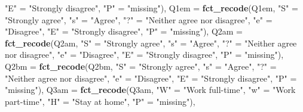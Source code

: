 \documentclass[
  finnish,
]{book}
\newenvironment{Shaded}{\begin{snugshade}}{\end{snugshade}}
\newcommand{\DataTypeTok}[1]{\textcolor[rgb]{0.13,0.29,0.53}{#1}}
\newcommand{\KeywordTok}[1]{\textcolor[rgb]{0.13,0.29,0.53}{\textbf{#1}}}
\newcommand{\NormalTok}[1]{#1}
\newcommand{\StringTok}[1]{\textcolor[rgb]{0.31,0.60,0.02}{#1}}
\begin{document}
\begin{Shaded}
\begin{Highlighting}[]
{{{{{{{{{{{{{{{{{{{{{{{{{{{{{{{{{{{{{{{{{{{{{{{{{{{{{{{{{{{{{{{{{{{{{{{{{{{{{{{{{{{{{{{{{{{{{{{{{{{{{{{{{{                           \StringTok{"E"}\NormalTok{ =}\StringTok{ "Strongly disagree"}\NormalTok{,}
                           \StringTok{"P"}\NormalTok{ =}\StringTok{ "missing"}\NormalTok{),}
           \DataTypeTok{Q1em =} \KeywordTok{fct_recode}\NormalTok{(Q1em,}
                           \StringTok{"S"}\NormalTok{ =}\StringTok{ "Strongly agree"}\NormalTok{,}
                           \StringTok{"s"}\NormalTok{ =}\StringTok{ "Agree"}\NormalTok{,}
                           \StringTok{"?"}\NormalTok{ =}\StringTok{ "Neither agree nor disagree"}\NormalTok{,}
                           \StringTok{"e"}\NormalTok{ =}\StringTok{ "Disagree"}\NormalTok{,}
                           \StringTok{"E"}\NormalTok{ =}\StringTok{ "Strongly disagree"}\NormalTok{,}
                           \StringTok{"P"}\NormalTok{ =}\StringTok{ "missing"}\NormalTok{),}
           \DataTypeTok{Q2am =} \KeywordTok{fct_recode}\NormalTok{(Q2am,}
                            \StringTok{"S"}\NormalTok{ =}\StringTok{ "Strongly agree"}\NormalTok{,}
                            \StringTok{"s"}\NormalTok{ =}\StringTok{ "Agree"}\NormalTok{,}
                            \StringTok{"?"}\NormalTok{ =}\StringTok{ "Neither agree nor disagree"}\NormalTok{,}
                            \StringTok{"e"}\NormalTok{ =}\StringTok{ "Disagree"}\NormalTok{,}
                            \StringTok{"E"}\NormalTok{ =}\StringTok{ "Strongly disagree"}\NormalTok{,}
                            \StringTok{"P"}\NormalTok{ =}\StringTok{ "missing"}\NormalTok{),}
           \DataTypeTok{Q2bm =} \KeywordTok{fct_recode}\NormalTok{(Q2bm,}
                            \StringTok{"S"}\NormalTok{ =}\StringTok{ "Strongly agree"}\NormalTok{,}
                            \StringTok{"s"}\NormalTok{ =}\StringTok{ "Agree"}\NormalTok{,}
                            \StringTok{"?"}\NormalTok{ =}\StringTok{ "Neither agree nor disagree"}\NormalTok{,}
                            \StringTok{"e"}\NormalTok{ =}\StringTok{ "Disagree"}\NormalTok{,}
                            \StringTok{"E"}\NormalTok{ =}\StringTok{ "Strongly disagree"}\NormalTok{,}
                            \StringTok{"P"}\NormalTok{ =}\StringTok{ "missing"}\NormalTok{),}
           \DataTypeTok{Q3am =} \KeywordTok{fct_recode}\NormalTok{(Q3am,}
                            \StringTok{"W"}\NormalTok{ =}\StringTok{ "Work full-time"}\NormalTok{,}
                            \StringTok{"w"}\NormalTok{ =}\StringTok{ "Work part-time"}\NormalTok{,}
                            \StringTok{"H"}\NormalTok{ =}\StringTok{ "Stay at home"}\NormalTok{,}
                            \StringTok{"P"}\NormalTok{ =}\StringTok{ "missing"}\NormalTok{),}
}}}}}}}}}}}}}}}}}}}}}}}}}}}}}}}}}}}}}}}}}}}}}}}}}}}}}}}}}}}}}}}}}}}}}}}}}}}}}}}}}}}}}}}}}}}}}}}}}}}}}}}}}}
\end{Highlighting}
\end{Shaded}
\end{document}
